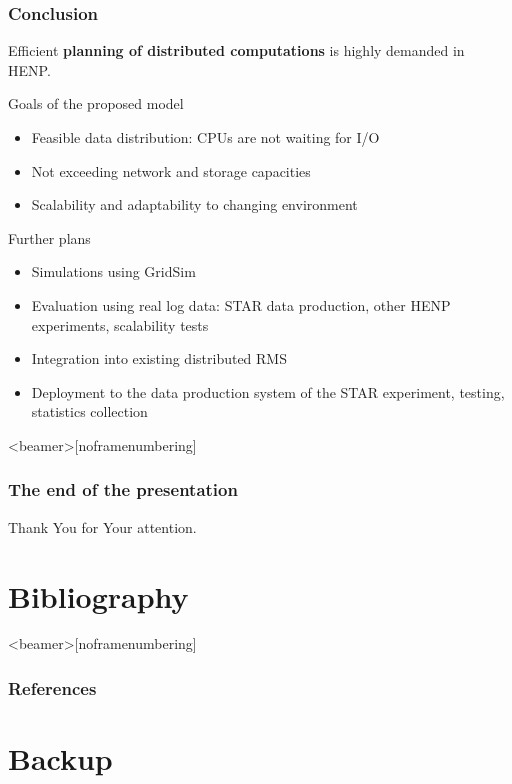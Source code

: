 \documentclass{beamer}
\begin{document}
\begin{frame}\frametitle{Conclusion}
     Efficient \textbf{planning of distributed computations} is highly demanded in HENP.
     
  \begin{block}{Goals of the proposed model}
    \begin{itemize}
      \item Feasible data distribution: CPUs are not waiting for I/O 
      \item Not exceeding network and storage capacities
      \item Scalability and adaptability to changing environment
    \end{itemize}
  \end{block}

  \begin{block}{Further plans}
    \begin{itemize}
      \item Simulations using GridSim
      \item Evaluation using real log data: STAR data production, other HENP experiments, scalability tests
      \item Integration into existing distributed RMS
      \item Deployment to the data production system of the STAR experiment, testing, statistics collection 
    \end{itemize}
   \end{block}
  \end{frame}


\begin{frame}<beamer>[noframenumbering]\frametitle{The end of the presentation}
\begin{center}
Thank You for Your attention.
\end{center}
\end{frame}

\section*{Bibliography}


\begin{frame}<beamer>[noframenumbering]\frametitle{References}
\nocite{Rudova, ACAT_cp, Makatun_cache, Zerola}
\renewcommand*{\bibfont}{\tiny}
\printbibliography%
\end{frame}

\section*{Backup}
\end{document}
